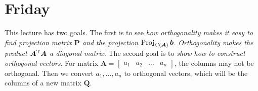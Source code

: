 

\section{Friday}
This lecture has two goals. The first is to see \emph{how orthogonality makes it easy to find projection matrix $\bm P$ and the projection $\operatorname{Proj}_{C(\bm A)}\bm b$}. \textit{Orthogonality makes the product $\bm A^{\mathrm T}\bm A$ a diagonal matrix}. The second goal is to \emph{show how to construct orthogonal vectors}. For matrix $\bm A=\begin{bmatrix}
a_1&a_2&\dots&a_n
\end{bmatrix}$, the columns may not be orthogonal. Then we convert $a_1,\dots,a_n$ to orthogonal vectors, which will be the columns of a new matrix $\bm Q$.
